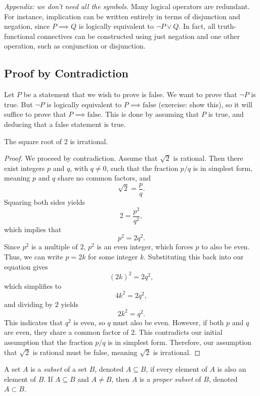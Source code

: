 \documentclass[../ium.tex]{subfiles}
\begin{document}
\begin{remark}
\textit{Appendix: we don't need all the symbols.} Many logical operators are redundant. For instance, implication can be written entirely in terms of disjunction and negation, since $P \implies Q$ is logically equivalent to $\neg P \lor Q$. In fact, all truth-functional connectives can be constructed using just negation and one other operation, such as conjunction or disjunction.
\end{remark}

\subsection{Proof by Contradiction}

Let $P$ be a statement that we wish to prove is false. We want to prove that $\neg P$ is true. But $\neg P$ is logically equivalent to $P\implies \text{false}$ (exercise: show this), so it will suffice to prove that $P\implies\text{false}$. This is done by assuming that $P$ is true, and deducing that a false statement is true.

\begin{theorem}
\begin{shaded*}
The square root of 2 is irrational.
\end{shaded*}
\end{theorem}
\begin{proof}
We proceed by contradiction. Assume that $\sqrt{2}$ is rational. Then there exist integers $p$ and $q$, with $q \ne 0$, such that the fraction $p/q$ is in simplest form, meaning $p$ and $q$ share no common factors, and
\[
\sqrt{2} = \frac{p}{q}.
\]
Squaring both sides yields
\[
2 = \frac{p^2}{q^2},
\]
which implies that
\[
p^2 = 2q^2.
\]
Since $p^2$ is a multiple of $2$, $p^2$ is an even integer, which forces $p$ to also be even. Thus, we can write $p = 2k$ for some integer $k$. Substituting this back into our equation gives
\[
(2k)^2 = 2q^2,
\]
which simplifies to
\[
4k^2 = 2q^2,
\]
and dividing by $2$ yields
\[
2k^2 = q^2.
\]
This indicates that $q^2$ is even, so $q$ must also be even. However, if both $p$ and $q$ are even, they share a common factor of $2$. This contradicts our initial assumption that the fraction $p/q$ is in simplest form. Therefore, our assumption that $\sqrt{2}$ is rational must be false, meaning $\sqrt{2}$ is irrational.
\end{proof}

\begin{definition}
\begin{shaded*}
A set $A$ is a \textit{subset} of a set $B$, denoted $A \subseteq B$, if every element of $A$ is also an element of $B$. If $A \subseteq B$ and $A \ne B$, then $A$ is a \textit{proper subset} of $B$, denoted $A \subset B$.
\end{shaded*}
\end{definition}
\end{document}
